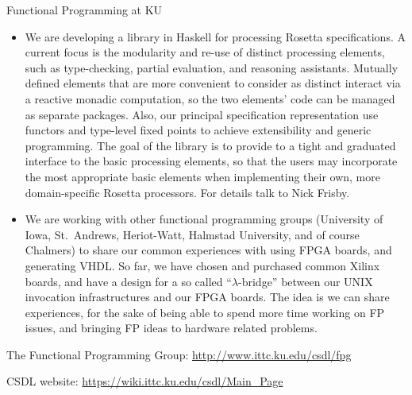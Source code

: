 \begin{hcarentry}[section]{Functional Programming at KU}
\begin{itemize}
\item We are developing a library in Haskell for processing Rosetta specifications.
A current focus is the modularity and re-use of distinct processing
elements, such as type-checking, partial evaluation, and reasoning
assistants. Mutually defined elements that are more convenient to
consider as distinct interact via a reactive monadic computation, so
the two elements' code can be managed as separate packages. Also, our
principal specification representation use functors and type-level
fixed points to achieve extensibility and generic programming. The
goal of the library is to provide to a tight and graduated interface
to the basic processing elements, so that the users may incorporate
the most appropriate basic elements when implementing their own, more
domain-specific Rosetta processors. For details talk to Nick Frisby.

\item We are working with other functional programming groups (University of Iowa, St.\ Andrews, Heriot-Watt, Halmstad University, and of course Chalmers) to share our common experiences with using FPGA boards, and generating VHDL.
So far, we have chosen and purchased common Xilinx boards, and have a design for a so called ``$\lambda$-bridge'' between our UNIX invocation infrastructures and our FPGA boards. The idea is we can share experiences, for the sake of 
being able to spend more time working on FP issues, and bringing FP ideas to hardware related problems.
\end{itemize}

\FurtherReading
\begin{compactitem}
\item   The Functional Programming Group:
    \url{http://www.ittc.ku.edu/csdl/fpg}

\item
  CSDL website: \url{https://wiki.ittc.ku.edu/csdl/Main_Page}
\end{compactitem}
\end{hcarentry}
